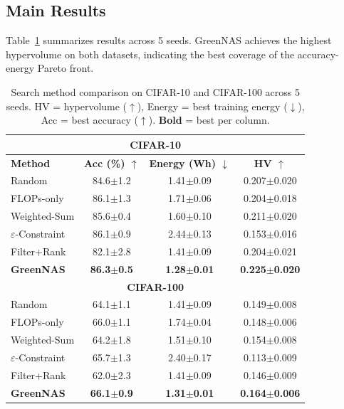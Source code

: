 \documentclass[10pt,twocolumn,letterpaper]{article}
\begin{document}
\subsection{Main Results}

Table~\ref{tab:main} summarizes results across 5 seeds. GreenNAS achieves the highest hypervolume on both datasets, indicating the best coverage of the accuracy-energy Pareto front.

\begin{table}[t]
\centering
\caption{Search method comparison on CIFAR-10 and CIFAR-100 across 5 seeds. HV = hypervolume ($\uparrow$), Energy = best training energy ($\downarrow$), Acc = best accuracy ($\uparrow$). \textbf{Bold} = best per column.}
\label{tab:main}
\small
\begin{tabular}{@{}l ccc@{}}
\toprule
\multicolumn{4}{c}{\textbf{CIFAR-10}} \\
\midrule
\textbf{Method} & \textbf{Acc (\%) $\uparrow$} & \textbf{Energy (Wh) $\downarrow$} & \textbf{HV $\uparrow$} \\
\midrule
Random & 84.6$\pm$1.2 & 1.41$\pm$0.09 & 0.207$\pm$0.020 \\
FLOPs-only & 86.1$\pm$1.3 & 1.71$\pm$0.06 & 0.204$\pm$0.018 \\
Weighted-Sum & 85.6$\pm$0.4 & 1.60$\pm$0.10 & 0.211$\pm$0.020 \\
$\varepsilon$-Constraint & 86.1$\pm$0.9 & 2.44$\pm$0.13 & 0.153$\pm$0.016 \\
Filter+Rank & 82.1$\pm$2.8 & 1.41$\pm$0.09 & 0.204$\pm$0.021 \\
\textbf{GreenNAS} & \textbf{86.3$\pm$0.5} & \textbf{1.28$\pm$0.01} & \textbf{0.225$\pm$0.020} \\
\midrule
\multicolumn{4}{c}{\textbf{CIFAR-100}} \\
\midrule
Random & 64.1$\pm$1.1 & 1.41$\pm$0.09 & 0.149$\pm$0.008 \\
FLOPs-only & 66.0$\pm$1.1 & 1.74$\pm$0.04 & 0.148$\pm$0.006 \\
Weighted-Sum & 64.2$\pm$1.8 & 1.51$\pm$0.10 & 0.154$\pm$0.008 \\
$\varepsilon$-Constraint & 65.7$\pm$1.3 & 2.40$\pm$0.17 & 0.113$\pm$0.009 \\
Filter+Rank & 62.0$\pm$2.3 & 1.41$\pm$0.09 & 0.146$\pm$0.009 \\
\textbf{GreenNAS} & \textbf{66.1$\pm$0.9} & \textbf{1.31$\pm$0.01} & \textbf{0.164$\pm$0.006} \\
\bottomrule
\end{tabular}
\end{table}
\end{document}
